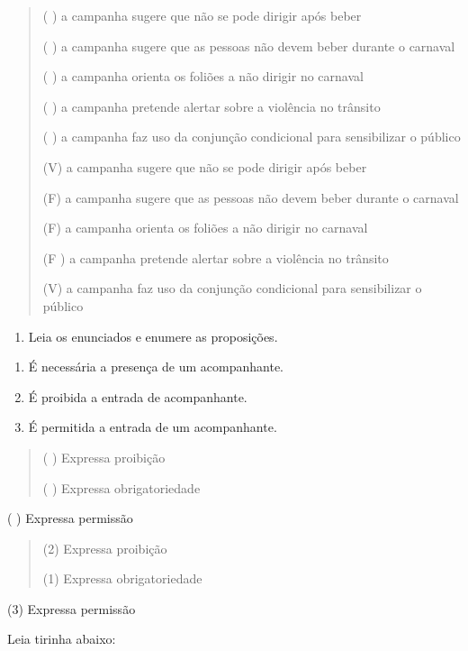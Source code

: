 {\begin{quote}
( ) a campanha sugere que não se pode dirigir após beber

( ) a campanha sugere que as pessoas não devem beber durante o carnaval

( ) a campanha orienta os foliões a não dirigir no carnaval

( ) a campanha pretende alertar sobre a violência no trânsito

( ) a campanha faz uso da conjunção condicional para sensibilizar o
público

(V) a campanha sugere que não se pode dirigir após beber

(F) a campanha sugere que as pessoas não devem beber durante o carnaval

(F) a campanha orienta os foliões a não dirigir no carnaval

(F ) a campanha pretende alertar sobre a violência no trânsito

(V) a campanha faz uso da conjunção condicional para sensibilizar o
público
\end{quote}

\begin{enumerate}
\def\labelenumi{\arabic{enumi})}
\setcounter{enumi}{7}
\tightlist
\item
  Leia os enunciados e enumere as proposições.
\end{enumerate}

\begin{enumerate}
\def\labelenumi{(\arabic{enumi})}
\item
  É necessária a presença de um acompanhante.
\item
  É proibida a entrada de acompanhante.
\item
  É permitida a entrada de um acompanhante.
\end{enumerate}

\begin{quote}
( ) Expressa proibição

( ) Expressa obrigatoriedade
\end{quote}

( ) Expressa permissão

\begin{quote}
(2) Expressa proibição

(1) Expressa obrigatoriedade
\end{quote}

(3) Expressa permissão

Leia tirinha abaixo:

}
